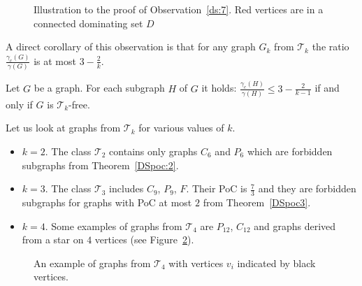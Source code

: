\begin{figure}
        \centering
	\begin{minipage}{.5\textwidth}
                \centering
                
		\caption*{}
        \end{minipage}%
	\begin{minipage}{.5\textwidth}
                \centering
                
                \caption*{}
        \end{minipage}%

	\caption{Illustration to the proof of Observation~\ref{ds:7}. Red vertices are in a connected dominating set \(D\)}
        \label{DS:DSTk}
\end{figure}

A direct corollary of this observation is that for any graph \(G_k\) from \(\mathcal{T}_k\) the ratio
\(\frac{\gamma_c(G)}{\gamma(G)}\) is at most \(3 - \frac{2}{k}\).
\begin{conj}\label{DS:conj}
Let \(G\) be a graph.
For each subgraph \(H\) of \(G\) it holds: \({\frac{\gamma_c(H)}{\gamma(H)}} \leq {3 - \frac{2}{k - 1}}\)
if and only if \(G\) is \(\mathcal{T}_k\)-free.
\end{conj}
Let us look at graphs from \(\mathcal{T}_k\) for various values of \(k\).
\begin{itemize}
	\item \(k = 2.\)
		The class \(\mathcal{T}_2\) contains only graphs \(C_6\) and \(P_6\) which are forbidden subgraphs from Theorem~\ref{DSpoc:2}.
	\item \(k = 3.\)
		The class \(\mathcal{T}_3\) includes \(C_9\), \(P_9\), \(F\).
		Their PoC is \(\frac{7}{3}\) and they are forbidden subgraphs for graphs with PoC at most \(2\) from Theorem~\ref{DSpoc3}.
	\item \(k = 4.\)
		Some examples of graphs from  \(\mathcal{T}_4\) are \(P_{12}\), \(C_{12}\) and graphs derived from a star on \(4\) vertices (see Figure~\ref{pic:T4}).
\end{itemize}
\begin{figure}
        \centering
        \begin{minipage}{.5\textwidth}
                \centering
                
                \caption*{}
        \end{minipage}%
        \begin{minipage}{.5\textwidth}
                \centering
                
                \caption*{}
        \end{minipage}
        \caption{An example of graphs from \(\mathcal{T}_4\)
        with vertices \(v_i\) indicated by black vertices.}
        \label{pic:T4}
\end{figure}

